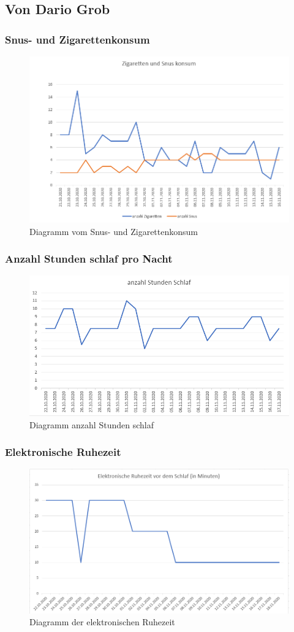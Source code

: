 \subsection{Von Dario Grob}
\authortoc{\dario}{\subsectionident}
\subsubsection{Snus- und Zigarettenkonsum}
\begin{figure}[H]
  \centering
  \includegraphics[width=0.7\linewidth]{./images/dario_tabak.PNG}
  \caption{Diagramm vom Snus- und Zigarettenkonsum}
\end{figure}
\subsubsection{Anzahl Stunden schlaf pro Nacht}
\begin{figure}[H]
  \centering
  \includegraphics[width=0.7\linewidth]{./images/dario_schlaf.PNG}
  \caption{Diagramm anzahl Stunden schlaf}
\end{figure}
\subsubsection{Elektronische Ruhezeit}
\begin{figure}[H]
  \centering
  \includegraphics[width=0.7\linewidth]{./images/dario_ruhezeit.PNG}
  \caption{Diagramm der elektronischen Ruhezeit}
\end{figure}
